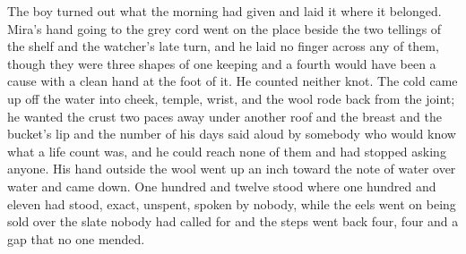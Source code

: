 The boy turned out what the morning had given and laid it where it belonged. Mira's hand going to the grey cord went on the place beside the two tellings of the shelf and the watcher's late turn, and he laid no finger across any of them, though they were three shapes of one keeping and a fourth would have been a cause with a clean hand at the foot of it. He counted neither knot. The cold came up off the water into cheek, temple, wrist, and the wool rode back from the joint; he wanted the crust two paces away under another roof and the breast and the bucket's lip and the number of his days said aloud by somebody who would know what a life count was, and he could reach none of them and had stopped asking anyone. His hand outside the wool went up an inch toward the note of water over water and came down. One hundred and twelve stood where one hundred and eleven had stood, exact, unspent, spoken by nobody, while the eels went on being sold over the slate nobody had called for and the steps went back four, four and a gap that no one mended.
